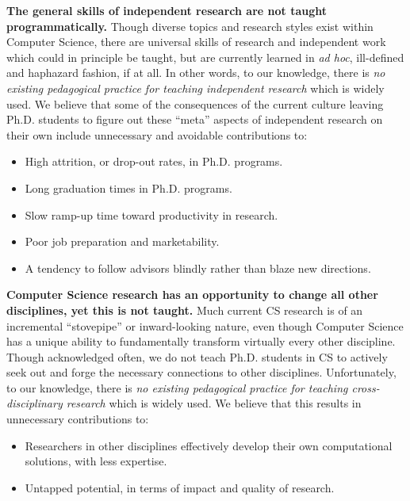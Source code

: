 {\bf The general skills of independent research are not taught
programmatically.}  Though diverse topics and research styles exist
within Computer Science, there are universal skills of research and
independent work which could in principle be taught, but are currently
learned in {\it ad hoc}, ill-defined and haphazard fashion, if at all.
In other words, to our knowledge, there is {\it no existing
pedagogical practice for teaching independent research} which is widely
used.
We believe that some of the consequences of the current culture
leaving Ph.D. students to figure out these ``meta'' aspects of
independent research on their own include unnecessary and avoidable
contributions to:
  \begin{itemize}
\itemsep=-1pt
  \item High attrition, or drop-out rates, in Ph.D. programs.
  \item Long graduation times in Ph.D. programs.
  \item Slow ramp-up time toward productivity in research.
  \item Poor job preparation and marketability.
  \item A tendency to follow advisors blindly rather than blaze new directions.
  \end{itemize}

{\bf Computer Science research has an opportunity to change all
other disciplines, yet this is not taught.}  Much current CS
research is of an incremental ``stovepipe'' or inward-looking
nature, even though Computer Science has a unique ability to
fundamentally transform virtually every other discipline.  Though
acknowledged often, we do not teach Ph.D. students in CS to actively
seek out and forge the necessary connections to other disciplines.
Unfortunately, to our knowledge, there is {\it no existing
pedagogical practice for teaching cross-disciplinary research} which is
widely used.  We believe that this results in unnecessary contributions to:
  \begin{itemize}
\itemsep=-1pt
  \item Researchers in other disciplines effectively develop their own
        computational solutions, with less expertise.
  \item Untapped potential, in terms of impact and quality of research.
  \end{itemize}

